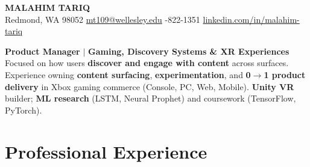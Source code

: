 \documentclass[11pt]{article}
\begin{document}
\begin{center}
  {\LARGE\bfseries
    {\huge M}ALAHIM {\huge T}ARIQ
  }\vspace{4pt}\\
  Redmond, WA 98052 \;\textbullet\;
  \href{mailto:mt109@wellesley.edu}{mt109@wellesley.edu} \;\textbullet{}-822-1351 \;\textbullet\;
  \href{https://www.linkedin.com/in/malahim-tariq}{linkedin.com/in/malahim-tariq}
\end{center}

\vspace{2pt}
\noindent\textbf{Product Manager} $|$ \textbf{Gaming, Discovery Systems \& XR Experiences} \\
\noindent Focused on how users \textbf{discover and engage with content} across surfaces. Experience owning \textbf{content surfacing}, \textbf{experimentation}, and \textbf{0$\to$1 product delivery} in Xbox gaming commerce (Console, PC, Web, Mobile). \textbf{Unity VR} builder; \textbf{ML research} (LSTM, Neural Prophet) and coursework (TensorFlow, PyTorch).

\section{Professional Experience}
\end{document}
